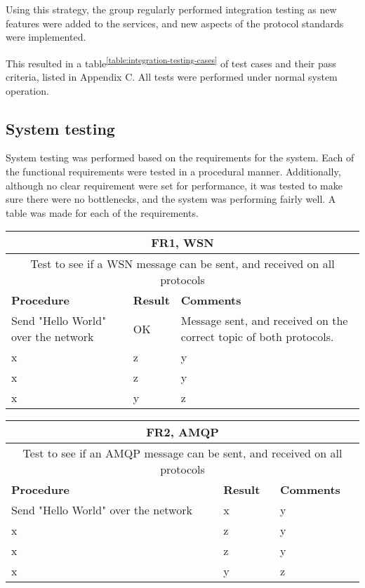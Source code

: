 Using this strategy, the group regularly performed integration testing as new features were added to the services, and new aspects of the protocol standards were implemented.

This resulted in a table\textsuperscript{\ref{table:integration-testing-cases}} of test cases and their pass criteria, listed in Appendix C. All tests were performed under normal system operation.

\subsection{System testing}
\label{subsec:testing-test_execution-system_testing}

System testing was performed based on the requirements for the system. Each of the functional requirements were tested in a procedural manner. Additionally, although no clear requirement were set for performance, it was tested to make sure there were no bottlenecks, and the system was performing fairly well. A table was made for each of the requirements.

\begin{table}[ht!]
\begin{tabular}{|m{4cm}|m{2cm}|m{4cm}|}
\hline
\multicolumn{3}{|c|}{\textbf{FR1, WSN}} \\ \hline
\multicolumn{3}{|c|}{{Test to see if a WSN message can be sent, and received on all protocols}} \\ \hline
\textbf{Procedure} & \textbf{Result} & \textbf{Comments} \\ \hline
Send "Hello World" over the network & OK & Message sent, and received on the correct topic of both protocols. \\ \hline
x&z&y \\ \hline
x&z&y \\ \hline
x&y&z \\ \hline
\end{tabular}
\end{table}

\begin{table}[ht!]
\begin{tabular}{|m{4cm}|m{2cm}|m{4cm}|}
\hline
\multicolumn{3}{|c|}{\textbf{FR2, AMQP}} \\ \hline
\multicolumn{3}{|c|}{{Test to see if an AMQP message can be sent, and received on all protocols}} \\ \hline
\textbf{Procedure} & \textbf{Result} & \textbf{Comments} \\ \hline
Send "Hello World" over the network & x & y \\ \hline
x&z&y \\ \hline
x&z&y \\ \hline
x&y&z \\ \hline
\end{tabular}
\end{table}

